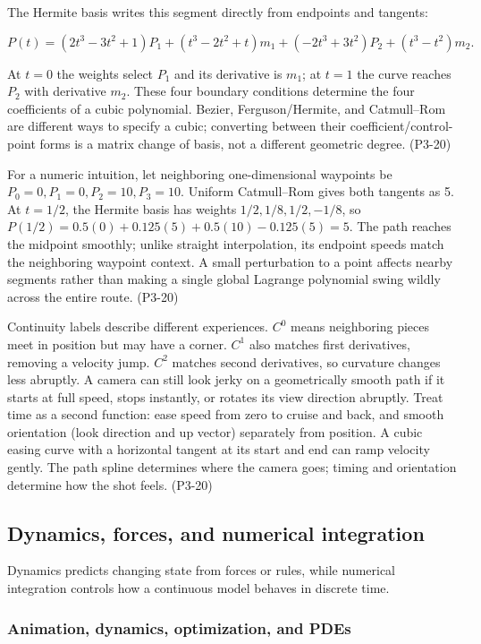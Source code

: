 The Hermite basis writes this segment directly from endpoints and tangents:

\[
P(t)=(2t^3-3t^2+1)P_1+(t^3-2t^2+t)m_1+(-2t^3+3t^2)P_2+(t^3-t^2)m_2.
\]

At \(t=0\) the weights select \(P_1\) and its derivative is \(m_1\); at \(t=1\) the curve reaches \(P_2\) with derivative \(m_2\). These four boundary conditions determine the four coefficients of a cubic polynomial. Bezier, Ferguson/Hermite, and Catmull--Rom are different ways to specify a cubic; converting between their coefficient/control-point forms is a matrix change of basis, not a different geometric degree. (P3-20)

For a numeric intuition, let neighboring one-dimensional waypoints be \(P_0=0,P_1=0,P_2=10,P_3=10\). Uniform Catmull--Rom gives both tangents as 5. At \(t=1/2\), the Hermite basis has weights \(1/2,1/8,1/2,-1/8\), so \(P(1/2)=0.5(0)+0.125(5)+0.5(10)-0.125(5)=5\). The path reaches the midpoint smoothly; unlike straight interpolation, its endpoint speeds match the neighboring waypoint context. A small perturbation to a point affects nearby segments rather than making a single global Lagrange polynomial swing wildly across the entire route. (P3-20)

Continuity labels describe different experiences. \(C^0\) means neighboring pieces meet in position but may have a corner. \(C^1\) also matches first derivatives, removing a velocity jump. \(C^2\) matches second derivatives, so curvature changes less abruptly. A camera can still look jerky on a geometrically smooth path if it starts at full speed, stops instantly, or rotates its view direction abruptly. Treat time as a second function: ease speed from zero to cruise and back, and smooth orientation (look direction and up vector) separately from position. A cubic easing curve with a horizontal tangent at its start and end can ramp velocity gently. The path spline determines where the camera goes; timing and orientation determine how the shot feels. (P3-20)

\subsection{Dynamics, forces, and numerical integration}\label{dynamics-forces-and-numerical-integration}

Dynamics predicts changing state from forces or rules, while numerical integration controls how a continuous model behaves in discrete time.

\subsubsection{Animation, dynamics, optimization, and PDEs}\label{animation-dynamics-optimization-and-pdes}

